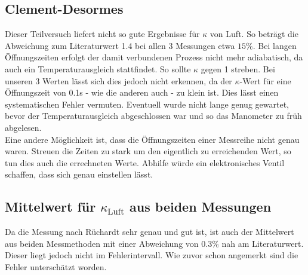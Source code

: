 \documentclass[12pt,a4paper,titlepage,headinclude,bibtotoc]{scrartcl}
\begin{document}
\subsection{Clement-Desormes}
Dieser Teilversuch liefert nicht so gute Ergebnisse für $\kappa$ von Luft.
So beträgt die Abweichung zum Literaturwert 1.4 bei allen 3 Messungen etwa $15\%$.
Bei langen Öffnungszeiten erfolgt der damit verbundenen Prozess nicht mehr adiabatisch, da auch ein Temperaturausgleich stattfindet.
So sollte $\kappa$ gegen 1 streben.
Bei unseren 3 Werten lässt sich dies jedoch nicht erkennen, da der $\kappa$-Wert für eine Öffnungszeit von 0.1s - wie die anderen auch - zu klein ist.
Dies lässt einen systematischen Fehler vermuten.
Eventuell wurde nicht lange genug gewartet, bevor der Temperaturausgleich abgeschlossen war und so das Manometer zu früh abgelesen.\\
Eine andere Möglichkeit ist, dass die Öffnungszeiten einer Messreihe nicht genau waren.
Streuen die Zeiten zu stark um den eigentlich zu erreichenden Wert, so tun dies auch die errechneten Werte.
Abhilfe würde ein elektronisches Ventil schaffen, dass sich genau einstellen lässt.

\subsection{Mittelwert für $\kappa_\text{Luft}$ aus beiden Messungen}
Da die Messung nach Rüchardt sehr genau und gut ist, ist auch der Mittelwert aus beiden Messmethoden mit einer Abweichung von $0.3\%$ nah am Literaturwert.
Dieser liegt jedoch nicht im Fehlerintervall.
Wie zuvor schon angemerkt sind die Fehler unterschätzt worden.

\newpage
\end{document}
